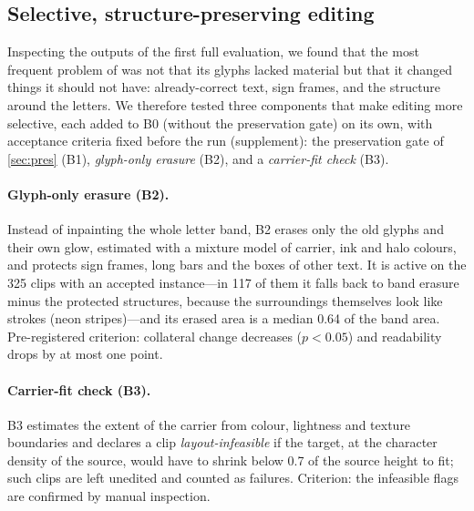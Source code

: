 \subsection{Selective, structure-preserving editing}
\label{sec:exp_sel}


Inspecting the outputs of the first full evaluation, we found that the most frequent problem of \method was not that its glyphs lacked material but that it changed things it should not have: already-correct text, sign frames, and the structure around the letters. We therefore tested three components that make editing more selective, each added to B0 (\method without the preservation gate) on its own, with acceptance criteria fixed before the run (supplement): the preservation gate of \cref{sec:pres} (B1), \emph{glyph-only erasure} (B2), and a \emph{carrier-fit check} (B3).

\paragraph{Glyph-only erasure (B2).} Instead of inpainting the whole letter band, B2 erases only the old glyphs and their own glow, estimated with a mixture model of carrier, ink and halo colours, and protects sign frames, long bars and the boxes of other text. It is active on the 325 clips with an accepted instance---in 117 of them it falls back to band erasure minus the protected structures, because the surroundings themselves look like strokes (\eg neon stripes)---and its erased area is a median 0.64 of the band area. Pre-registered criterion: collateral change decreases ($p<0.05$) and readability drops by at most one point.

\paragraph{Carrier-fit check (B3).} B3 estimates the extent of the carrier from colour, lightness and texture boundaries and declares a clip \emph{layout-infeasible} if the target, at the character density of the source, would have to shrink below 0.7 of the source height to fit; such clips are left unedited and counted as failures. Criterion: the infeasible flags are confirmed by manual inspection.


